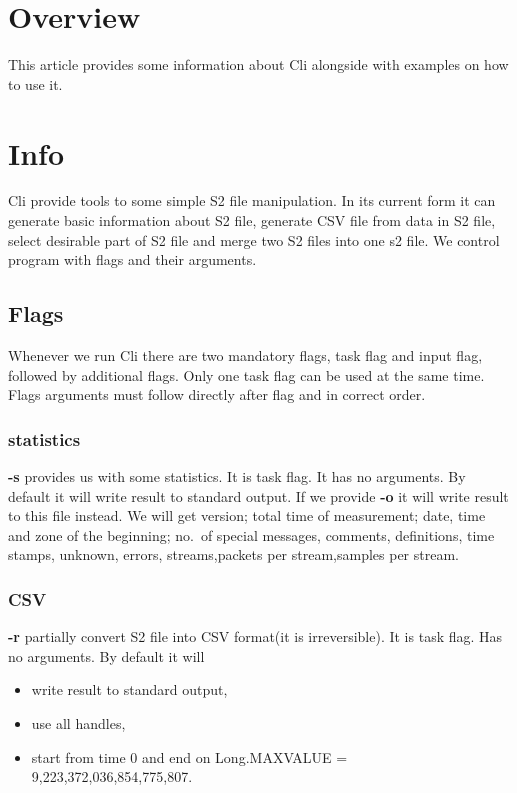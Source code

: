 \documentclass[english]{article}
\begin{document}
\section{Overview}

This article provides some information about Cli alongside with examples on how to use it.

\section{Info}

Cli provide tools to some simple S2 file manipulation. In its current form it can generate basic information about S2 file, generate CSV file from data in S2 file, select desirable part of S2 file and merge two S2 files into one s2 file.
We control program with flags and their arguments.

\subsection{Flags}
Whenever we run Cli there are two mandatory flags, task flag and input flag, followed by additional flags. Only one task flag can be used at the same time. Flags arguments must follow directly after flag and in correct order.


\subsubsection{statistics}
\textbf{-s} provides us with some statistics. It is task flag. It has no arguments. By default it will write result to standard output. If we provide \textbf{-o} it will write result to this file instead. We will get  version; total time of measurement; date, time and zone of the beginning; no.\ of special messages, comments,   definitions, time stamps, unknown, errors, streams,packets per stream,samples per stream.

\subsubsection{CSV}
\textbf{-r} partially convert S2 file into CSV format(it is irreversible). It is task flag. Has no arguments. By default it will 
\begin{itemize}
\item  write result to standard output,
\item use all handles,
\item start from time 0 and end on Long.MAXVALUE = 9,223,372,036,854,775,807.
\end{itemize}
\end{document}
